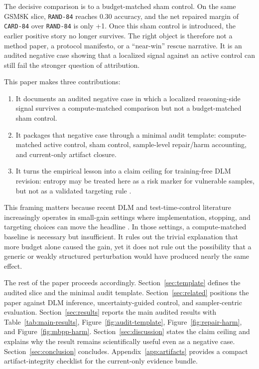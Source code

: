 \documentclass{article}
\begin{document}
The decisive comparison is to a budget-matched sham control. On the same GSM8K slice, \texttt{RAND-84} reaches 0.30 accuracy, and the net repaired margin of \texttt{CARD-84} over \texttt{RAND-84} is only +1. Once this sham control is introduced, the earlier positive story no longer survives. The right object is therefore not a method paper, a protocol manifesto, or a ``near-win'' rescue narrative. It is an audited negative case showing that a localized signal against an active control can still fail the stronger question of attribution.

This paper makes three contributions:
\begin{enumerate}[leftmargin=1.5em]
\item It documents an audited negative case in which a localized reasoning-side signal survives a compute-matched comparison but not a budget-matched sham control.
\item It packages that negative case through a minimal audit template: compute-matched active control, sham control, sample-level repair/harm accounting, and current-only artifact closure.
\item It turns the empirical lesson into a claim ceiling for training-free DLM revision: entropy may be treated here as a risk marker for vulnerable samples, but not as a validated targeting rule \citep{actcabcodec2024,confidenceovertime2026}.
\end{enumerate}

This framing matters because recent DLM and test-time-control literature increasingly operates in small-gain settings where implementation, stopping, and targeting choices can move the headline \citep{dpad2025,prism2026,samplercentric2026}. In those settings, a compute-matched baseline is necessary but insufficient. It rules out the trivial explanation that more budget alone caused the gain, yet it does not rule out the possibility that a generic or weakly structured perturbation would have produced nearly the same effect.

The rest of the paper proceeds accordingly. Section~\ref{sec:template} defines the audited slice and the minimal audit template. Section~\ref{sec:related} positions the paper against DLM inference, uncertainty-guided control, and sampler-centric evaluation. Section~\ref{sec:results} reports the main audited results with Table~\ref{tab:main-results}, Figure~\ref{fig:audit-template}, Figure~\ref{fig:repair-harm}, and Figure~\ref{fig:mbpp-harm}. Section~\ref{sec:discussion} states the claim ceiling and explains why the result remains scientifically useful even as a negative case. Section~\ref{sec:conclusion} concludes. Appendix~\ref{app:artifacts} provides a compact artifact-integrity checklist for the current-only evidence bundle.
\end{document}
